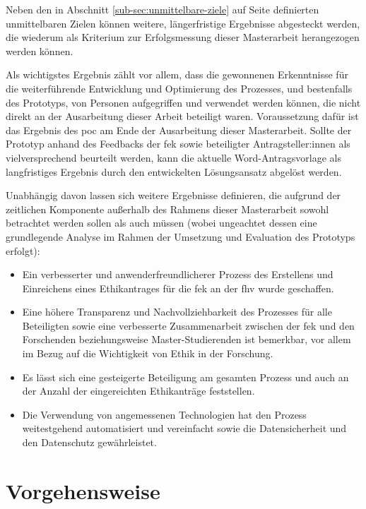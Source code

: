 \documentclass[a4paper,12pt,twoside]{scrreprt}
\begin{document}
Neben den in Abschnitt \ref{sub-sec:unmittelbare-ziele} auf Seite \pageref{sub-sec:unmittelbare-ziele} definierten unmittelbaren Zielen können weitere, längerfristige Ergebnisse abgesteckt werden, die wiederum als Kriterium zur Erfolgsmessung dieser Masterarbeit herangezogen werden können.

Als wichtigstes Ergebnis zählt vor allem, dass die gewonnenen Erkenntnisse für die weiterführende Entwicklung und Optimierung des Prozesses, und bestenfalls des Prototyps, von Personen aufgegriffen und verwendet werden können, die nicht direkt an der Ausarbeitung dieser Arbeit beteiligt waren. Voraussetzung dafür ist das Ergebnis des \ac{poc} am Ende der Ausarbeitung dieser Masterarbeit. Sollte der Prototyp anhand des Feedbacks der \acl{fek} sowie beteiligter Antragsteller:innen als vielversprechend beurteilt werden, kann die aktuelle Word-Antragsvorlage als langfristiges Ergebnis durch den entwickelten Lösungsansatz abgelöst werden.

\medskip

Unabhängig davon lassen sich weitere Ergebnisse definieren, die aufgrund der zeitlichen Komponente außerhalb des Rahmens dieser Masterarbeit sowohl betrachtet werden sollen als auch müssen (wobei ungeachtet dessen eine grundlegende Analyse im Rahmen der Umsetzung und Evaluation des Prototyps erfolgt):
\begin{itemize}
    \item Ein verbesserter und anwenderfreundlicherer Prozess des Erstellens und Einreichens eines Ethikantrages für die \acl{fek} an der \acl{fhv} wurde geschaffen.
    \item Eine höhere Transparenz und Nachvollziehbarkeit des Prozesses für alle Beteiligten sowie eine verbesserte Zusammenarbeit zwischen der \acl{fek} und den Forschenden beziehungsweise Master-Studierenden ist bemerkbar, vor allem im Bezug auf die Wichtigkeit von Ethik in der Forschung.
    \item Es lässt sich eine gesteigerte Beteiligung am gesamten Prozess und auch an der Anzahl der eingereichten Ethikanträge feststellen.
    \item Die Verwendung von angemessenen Technologien hat den Prozess weitestgehend automatisiert und vereinfacht sowie die Datensicherheit und den Datenschutz gewährleistet.
\end{itemize}

\section{Vorgehensweise}
\label{sec:vorgehensweise}
\end{document}
